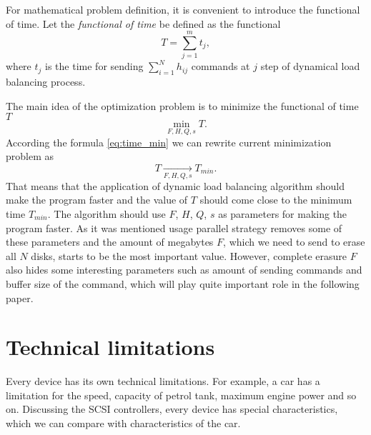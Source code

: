 For mathematical problem definition, it is convenient to introduce the functional of time. Let the \emph{functional of time} be defined as the functional 
\begin{equation}
	T=\sum_{j=1}^{m}t_j,
\end{equation}
where $t_j$ is the time for sending $\sum_{i=1}^{N}h_{ij}$ commands at $j$ step of dynamical load balancing process.

The main idea of the optimization problem is to minimize the functional of time $T$
\begin{equation}
\label{opt_problem}
	\min_{F,H,Q,s}T.
\end{equation}
According the formula \ref{eq:time_min} we can rewrite current minimization problem as
\begin{equation}
	T \xrightarrow[F,H,Q,s]{} T_{min}.
\end{equation}
That means that the application of dynamic load balancing algorithm should make the program faster and the value of $T$ should come close to the minimum time $T_{min}$. The algorithm should use $F$, $H$, $Q$, $s$ as parameters for making the program faster. As it was mentioned usage parallel strategy removes some of these parameters and the amount of megabytes $F$, which we need to send to erase all $N$ disks, starts to be the most important value. However, complete erasure $F$ also hides some interesting parameters such as amount of sending commands and buffer size of the command, which will play quite important role in the following paper.

\section{Technical limitations}
Every device has its own technical limitations. For example, a car has a limitation for the speed, capacity of petrol tank, maximum engine power and so on. Discussing the SCSI controllers, every device has special characteristics, which we can compare with characteristics of the car.


